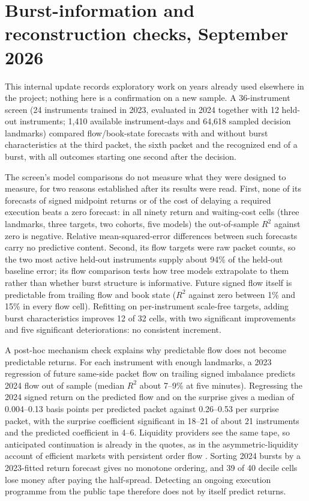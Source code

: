 \documentclass[11pt]{article}
\begin{document}
\section{Burst-information and reconstruction checks, September 2026}
\label{sec:burstinformation2026}

This internal update records exploratory work on years already used elsewhere in the project;
nothing here is a confirmation on a new sample. A 36-instrument screen (24 instruments trained in
2023, evaluated in 2024 together with 12 held-out instruments; 1,410 available instrument-days and
64,618 sampled decision landmarks) compared flow/book-state forecasts with and without burst
characteristics at the third packet, the sixth packet and the recognized end of a burst, with
all outcomes starting one second after the decision.

The screen's model comparisons do not measure what they were designed to measure, for two
reasons established after its results were read. First, none of its forecasts of signed
midpoint returns or of the cost of delaying a required execution beats a zero forecast: in all
ninety return and waiting-cost cells (three landmarks, three targets, two cohorts, five models)
the out-of-sample $R^2$ against zero is negative. Relative mean-squared-error differences between
such forecasts carry no predictive content. Second, its flow targets were raw packet counts, so
the two most active held-out instruments supply about 94\% of the held-out baseline error; its
flow comparison tests how tree models extrapolate to them rather than whether burst structure is
informative. Future signed flow itself is predictable from trailing flow and book state
($R^2$ against zero between 1\% and 15\% in every flow cell). Refitting on per-instrument
scale-free targets, adding burst characteristics improves 12 of 32 cells, with two significant
improvements and five significant deteriorations: no consistent increment.

A post-hoc mechanism check explains why predictable flow does not become predictable returns.
For each instrument with enough landmarks, a 2023 regression of future same-side packet flow on
trailing signed imbalance predicts 2024 flow out of sample (median $R^2$ about 7--9\% at five
minutes). Regressing the 2024 signed return on the predicted flow and on the surprise gives a
median of 0.004--0.13 basis points per predicted packet against 0.26--0.53 per surprise packet,
with the surprise coefficient significant in 18--21 of about 21 instruments and the predicted
coefficient in 4--6. Liquidity providers see the same tape, so anticipated continuation is
already in the quotes, as in the asymmetric-liquidity account of efficient markets with
persistent order flow \citep{bouchaud2004,lillo2004,farmer2013}. Sorting 2024 bursts by a
2023-fitted return forecast gives no monotone ordering, and 39 of 40 decile cells lose money
after paying the half-spread. Detecting an ongoing execution programme from the public tape
therefore does not by itself predict returns.
\end{document}
